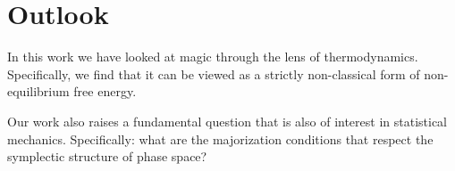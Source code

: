 \documentclass[pra,
aps,
twocolumn,
superscriptaddress,
groupedaddress,
nofootinbib,
reprint
]{revtex4-1}
\begin{document}
\section{Outlook}
\label{sec:outlook}

In this work we have looked at magic through the lens of thermodynamics. Specifically, we find that it can be viewed as a strictly non-classical form of non-equilibrium free energy. 

Our work also raises a fundamental question that is also of interest in statistical mechanics. Specifically: what are the majorization conditions that respect the symplectic structure of phase space?



%


\appendix

\end{document}
